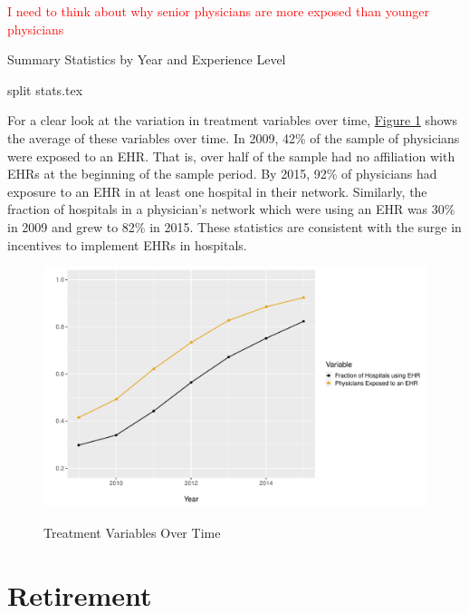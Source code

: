 \documentclass[11pt]{article}
\begin{document}
\textcolor{red}{I need to think about why senior physicians are more exposed than younger physicians}



\vspace{5mm}
\begin{table}[ht]
\caption{Summary Statistics by Year and Experience Level}
{split stats.tex}
\end{table}
\vspace{5mm}




For a clear look at the variation in treatment variables over time, \hyperref[fig:figure1]{Figure 1} shows the average of these variables over time. In 2009, 42\% of the sample of physicians were exposed to an EHR. That is, over half of the sample had no affiliation with EHRs at the beginning of the sample period. By 2015, 92\% of physicians had exposure to an EHR in at least one hospital in their network. Similarly, the fraction of hospitals in a physician's network which were using an EHR was 30\% in 2009 and grew to 82\% in 2015. These statistics are consistent with the surge in incentives to implement EHRs in hospitals. 

\vspace{5mm}
\begin{figure}[ht]
    \caption{Treatment Variables Over Time}
    \vspace{-2mm}
    \includegraphics[scale=.5]{Objects/sum_stats_year.pdf}
    \label{fig:figure1}
\end{figure}
\vspace{5mm}



\section{Retirement}
\end{document}

